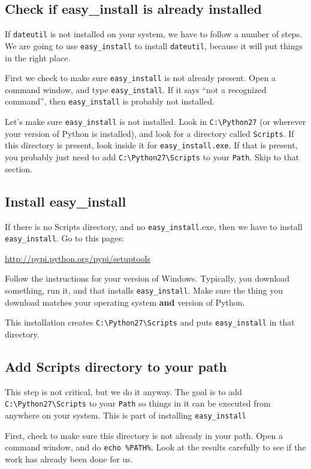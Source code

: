 \subsection{Check if easy\_install is already installed}

If \verb=dateutil= is not installed on your system, we have to follow
a number of steps. We are going to use \verb=easy_install= to install
\verb=dateutil=, because it will put things in the right place.

First we check to make sure \verb=easy_install= is not already present.
Open a command window, and type \verb=easy_install=. If it says
``not a recognized command'', then \verb=easy_install= is probably not
installed.

Let's make sure \verb=easy_install= is not installed. Look in
\verb=C:\Python27= (or wherever your version of Python is installed),
and look for a directory called \verb=Scripts=. If this directory is
present, look inside it for \verb=easy_install.exe=. If that is
present, you probably just need to add \verb=C:\Python27\Scripts= to
your \verb=Path=. Skip to that section.

\subsection{Install easy\_install}

If there is no Scripts directory, and no \verb=easy_install=.exe, then
we have to install \verb=easy_install=. Go to this pages:

\url{http://pypi.python.org/pypi/setuptools}

Follow the instructions for your version of Windows. Typically, you
download something, run it, and that installs \verb=easy_install=.
Make sure the thing you download matches your operating system
\textbf{and} version of Python.

This installation creates \verb=C:\Python27\Scripts= and puts \verb=easy_install=
in that directory.


\subsection{Add Scripts directory to your path}

This step is not critical, but we do it anyway. The goal is to add
\verb=C:\Python27\Scripts= to your \verb=Path= so things in it can
be executed from anywhere on your system. This is part of installing
\verb=easy_install=

First, check to make sure this directory is not already in your path.
Open a command window, and do \verb=echo %PATH%=. Look at the results
carefully to see if the work has already been done for us.

